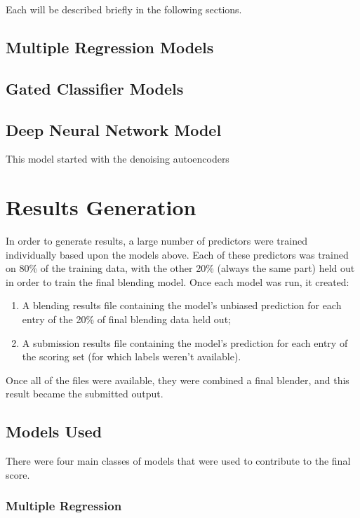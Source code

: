\documentclass{article}
\begin{document}
Each will be described briefly in the following sections.

\subsection{Multiple Regression Models}

\subsection{Gated Classifier Models}

\subsection{Deep Neural Network Model}

This model started with the denoising autoencoders

\section{Results Generation}

In order to generate results, a large number of predictors were trained individually based upon the models above.  Each of these predictors was trained on 80\% of the training data, with the other 20\% (always the same part) held out in order to train the final blending model.  Once each model was run, it created:

\begin{enumerate}
\item A blending results file containing the model's unbiased prediction for each entry of the 20\% of final blending data held out;
\item A submission results file containing the model's prediction for each entry of the scoring set (for which labels weren't available).
\end{enumerate}

Once all of the files were available, they were combined a final blender, and this result became the submitted output.

\subsection{Models Used}

There were four main classes of models that were used to contribute to the final score.

\subsubsection{Multiple Regression}
\end{document}
